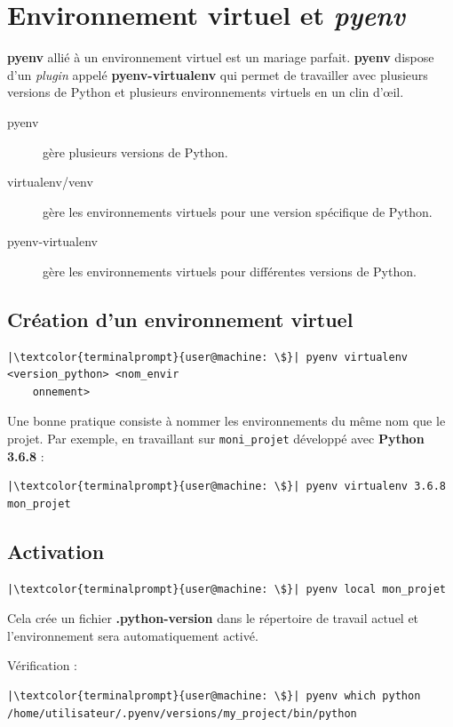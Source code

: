 \section{Environnement virtuel et \textit{pyenv}}
\textbf{pyenv} allié à un environnement virtuel est un mariage parfait. \textbf{pyenv} dispose d'un \textit{plugin} appelé \textbf{pyenv-virtualenv} qui permet de travailler avec plusieurs versions de Python et plusieurs environnements virtuels en un clin d'œil.
\begin{description}
    \item[pyenv] gère plusieurs versions de Python.
    \item[virtualenv/venv] gère les environnements virtuels pour une version spécifique de Python.
    \item[pyenv-virtualenv] gère les environnements virtuels pour différentes versions de Python.
\end{description}

\subsection*{Création d'un environnement virtuel}
\begin{lstlisting}[style=terminal]
|\textcolor{terminalprompt}{user@machine: \$}| pyenv virtualenv <version_python> <nom_envir
    onnement>
\end{lstlisting}

Une bonne pratique consiste à nommer les environnements du même nom que le projet. Par exemple, en travaillant sur \texttt{moni\_projet}  développé avec \textbf{Python 3.6.8} :
\begin{lstlisting}[style=terminal]
|\textcolor{terminalprompt}{user@machine: \$}| pyenv virtualenv 3.6.8 mon_projet
\end{lstlisting}

\subsection*{Activation}
\begin{lstlisting}[style=terminal]
|\textcolor{terminalprompt}{user@machine: \$}| pyenv local mon_projet
\end{lstlisting}

Cela crée un fichier \textbf{.python-version} dans le répertoire de travail actuel et l'environnement sera automatiquement activé.

Vérification :
\begin{lstlisting}[style=terminal]
|\textcolor{terminalprompt}{user@machine: \$}| pyenv which python
/home/utilisateur/.pyenv/versions/my_project/bin/python
\end{lstlisting}

